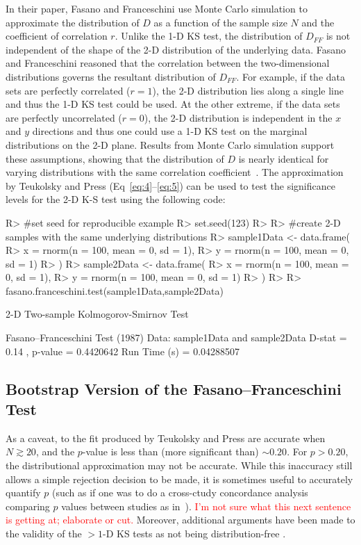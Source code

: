 \documentclass[codesnippet]{jss}
\newcommand{\RBnote}[1]{\textcolor{red}{#1}}
\begin{document}
In their paper, Fasano and Franceschini use Monte Carlo simulation to
approximate the distribution of $D$ as a function of the sample
size $N$ and the coefficient of correlation $r$. Unlike the 1-D KS
test, the distribution of
$D_{FF}$ is not independent of the shape of the 2-D distribution of the 
underlying data. Fasano
and Franceschini reasoned that the correlation between
the two-dimensional distributions governs the resultant
distribution of $D_{FF}$. For example, if the data sets are perfectly
correlated ($r = 1$), the 2-D distribution lies along a single line and thus
the 1-D KS test could be used. At the other extreme, if the data sets are perfectly
uncorrelated ($r = 0$), the 2-D distribution is independent in the $x$
and $y$ directions and thus one could use a 1-D KS test on the marginal
distributions on the 2-D plane.
%
Results from Monte Carlo simulation support these assumptions, showing
that the distribution of $D$ is nearly identical for varying
distributions with the same correlation coefficient~\citep{Fasano1987}.
The approximation 
by Teukolsky and Press (Eq~\ref{eq:4}--\ref{eq:5})
can be used to test the significance levels for the 2-D K-S test using
the following code:
%
\begin{CodeChunk}
\begin{CodeInput}
R> #set seed for reproducible example
R> set.seed(123)
R>
R> #create 2-D samples with the same underlying distributions
R> sample1Data <- data.frame(
R>  x = rnorm(n = 100, mean = 0, sd = 1),
R>  y = rnorm(n = 100, mean = 0, sd = 1)
R> )
R> sample2Data <- data.frame(
R>  x = rnorm(n = 100, mean = 0, sd = 1),
R>  y = rnorm(n = 100, mean = 0, sd = 1)
R> )
R>
R> fasano.franceschini.test(sample1Data,sample2Data)
\end{CodeInput}
\begin{CodeOutput}
      2-D Two-sample Kolmogorov-Smirnov Test

 Fasano--Franceschini Test (1987)
 Data:  sample1Data and sample2Data
 D-stat =  0.14 , p-value =  0.4420642
 Run Time (s) =  0.04288507
\end{CodeOutput}
\end{CodeChunk}

\subsection{Bootstrap Version of the Fasano--Franceschini Test}

As a caveat, to the fit produced by Teukolsky and Press are accurate when $N \gtrsim 20$, and the $p$-value is less than (more significant than) $\sim 0.20$. For $p > 0.20$, the distributional approximation may not be accurate. While this inaccuracy still allows a simple rejection decision to be made, it is sometimes useful to accurately quantify $p$ (such as if one was to do a cross-ctudy concordance analysis comparing $p$ values between studies as in~\citep{Ness-Cohn2020}). 
%
\RBnote{I'm not sure what this next sentence is getting at; elaborate or cut.} Moreover, additional arguments have been made to the validity of the $>1$-D KS tests as not being distribution-free \citep{Babu2006}.
\end{document}
